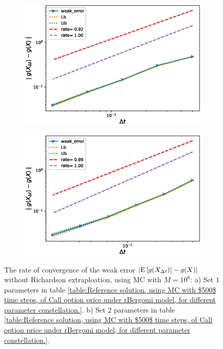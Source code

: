 \FloatBarrier
\begin{figure}[h!]
	\centering
	\begin{subfigure}{.35\textwidth}
		\centering
		\includegraphics[width=1\linewidth]{./figures/rBergomi_weak_error_rates/without_richardson/H_043/weak_convergence_order_Bergomi_H_043_K_1_M_10_6_CI_relative}
		\caption{}
		\label{fig:sub3}
	\end{subfigure}%
	\begin{subfigure}{.35\textwidth}
		\centering
		\includegraphics[width=1\linewidth]{./figures/rBergomi_weak_error_rates/without_richardson/H_007/weak_convergence_order_Bergomi_H_007_K_1_M_10_6_CI_relative}
		\caption{}
		\label{fig:sub4}
	\end{subfigure}
	
	\caption{The rate of convergence of the weak error  $\left\lvert\mathrm{E}\left[g(X_{\Delta t})\right]-g(X)\right\rvert$  without Richardson extraploation, using MC with $M=10^6$: a) Set $1$ parameters in table \ref{table:Reference solution, using MC with $500$ time steps, of Call option price under rBergomi model, for different parameter constellation.}.  b) Set $2$ parameters in table \ref{table:Reference solution, using MC with $500$ time steps, of Call option price under rBergomi model, for different parameter constellation.}.}
	\label{fig:Weak_rate_set1_set_2_without_rich}
\end{figure}



